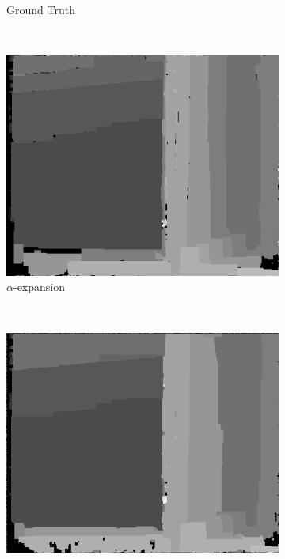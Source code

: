 \documentclass[letterpaper, 10 pt, conference]{ieeeconf}  %
\begin{document}
\begin{figure}[t]
\begin{subfigure}[b]{0.3\textwidth}
                \caption{Ground Truth}
                \label{fig:farm}
        \end{subfigure}
                ~ %
        \begin{subfigure}[b]{0.3\textwidth}
                \centering
                \includegraphics[width=\textwidth]{imgs/l2disparity-expansion.png}
                \caption{$\alpha$-expansion}
                \label{fig:farm}
        \end{subfigure}
                ~ %
        \begin{subfigure}[b]{0.3\textwidth}
                \centering
                \includegraphics[width=\textwidth]{imgs/l2disparity-swap.png}

\end{subfigure}
\end{figure}
\end{document}
